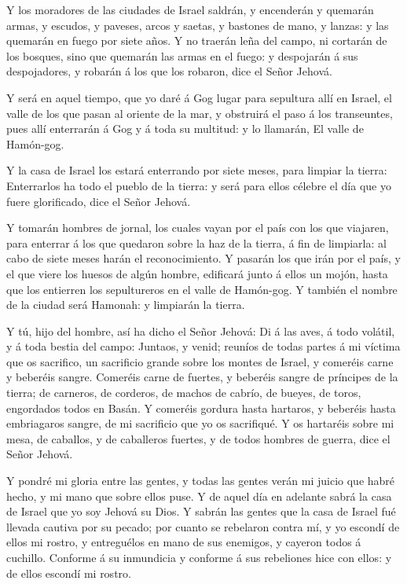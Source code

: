  Y los moradores de las ciudades de Israel saldrán, y
encenderán y quemarán armas, y escudos, y paveses, arcos y saetas, y
bastones de mano, y lanzas: y las quemarán en fuego por siete años.
 Y no traerán leña del campo, ni cortarán de los bosques,
sino que quemarán las armas en el fuego: y despojarán á sus
despojadores, y robarán á los que los robaron, dice el Señor Jehová.

 Y será en aquel tiempo, que yo daré á Gog lugar para
sepultura allí en Israel, el valle de los que pasan al oriente de la
mar, y obstruirá el paso á los transeuntes, pues allí enterrarán á Gog y
á toda su multitud: y lo llamarán, El valle de Hamón-gog.

 Y la casa de Israel los estará enterrando por siete meses,
para limpiar la tierra:  Enterrarlos ha todo el pueblo de
la tierra: y será para ellos célebre el día que yo fuere glorificado,
dice el Señor Jehová.

 Y tomarán hombres de jornal, los cuales vayan por el país
con los que viajaren, para enterrar á los que quedaron sobre la haz de
la tierra, á fin de limpiarla: al cabo de siete meses harán el
reconocimiento.  Y pasarán los que irán por el país, y el
que viere los huesos de algún hombre, edificará junto á ellos un mojón,
hasta que los entierren los sepultureros en el valle de Hamón-gog.
 Y también el nombre de la ciudad será Hamonah: y limpiarán
la tierra.

 Y tú, hijo del hombre, así ha dicho el Señor Jehová: Di á
las aves, á todo volátil, y á toda bestia del campo: Juntaos, y venid;
reuníos de todas partes á mi víctima que os sacrifico, un sacrificio
grande sobre los montes de Israel, y comeréis carne y beberéis sangre.
 Comeréis carne de fuertes, y beberéis sangre de príncipes
de la tierra; de carneros, de corderos, de machos de cabrío, de bueyes,
de toros, engordados todos en Basán.  Y comeréis gordura
hasta hartaros, y beberéis hasta embriagaros sangre, de mi sacrificio
que yo os sacrifiqué.  Y os hartaréis sobre mi mesa, de
caballos, y de caballeros fuertes, y de todos hombres de guerra, dice el
Señor Jehová.

 Y pondré mi gloria entre las gentes, y todas las gentes
verán mi juicio que habré hecho, y mi mano que sobre ellos puse.
 Y de aquel día en adelante sabrá la casa de Israel que yo
soy Jehová su Dios.  Y sabrán las gentes que la casa de
Israel fué llevada cautiva por su pecado; por cuanto se rebelaron contra
mí, y yo escondí de ellos mi rostro, y entreguélos en mano de sus
enemigos, y cayeron todos á cuchillo.  Conforme á su
inmundicia y conforme á sus rebeliones hice con ellos: y de ellos
escondí mi rostro.

